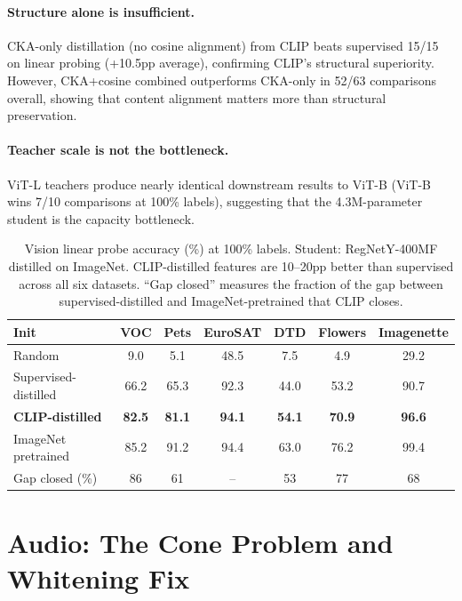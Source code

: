 \documentclass{article}
\begin{document}
\paragraph{Structure alone is insufficient.}
CKA-only distillation (no cosine alignment) from CLIP beats supervised 15/15 on linear probing (+10.5pp average), confirming CLIP's structural superiority.
However, CKA+cosine combined outperforms CKA-only in 52/63 comparisons overall, showing that content alignment matters more than structural preservation.

\paragraph{Teacher scale is not the bottleneck.}
ViT-L teachers produce nearly identical downstream results to ViT-B (ViT-B wins 7/10 comparisons at 100\% labels), suggesting that the 4.3M-parameter student is the capacity bottleneck.

\begin{table}[t]
\centering
\caption{Vision linear probe accuracy (\%) at 100\% labels. Student: RegNetY-400MF distilled on ImageNet.
CLIP-distilled features are 10--20pp better than supervised across all six datasets.
``Gap closed'' measures the fraction of the gap between supervised-distilled and ImageNet-pretrained that CLIP closes.}
\label{tab:vision}
\small
\begin{tabular}{lcccccc}
\toprule
\textbf{Init} & \textbf{VOC} & \textbf{Pets} & \textbf{EuroSAT} & \textbf{DTD} & \textbf{Flowers} & \textbf{Imagenette} \\
\midrule
Random & 9.0 & 5.1 & 48.5 & 7.5 & 4.9 & 29.2 \\
Supervised-distilled & 66.2 & 65.3 & 92.3 & 44.0 & 53.2 & 90.7 \\
\textbf{CLIP-distilled} & \textbf{82.5} & \textbf{81.1} & \textbf{94.1} & \textbf{54.1} & \textbf{70.9} & \textbf{96.6} \\
ImageNet pretrained & 85.2 & 91.2 & 94.4 & 63.0 & 76.2 & 99.4 \\
\midrule
Gap closed (\%) & 86 & 61 & -- & 53 & 77 & 68 \\
\bottomrule
\end{tabular}
\end{table}

\section{Audio: The Cone Problem and Whitening Fix}
\label{sec:audio}
\end{document}

